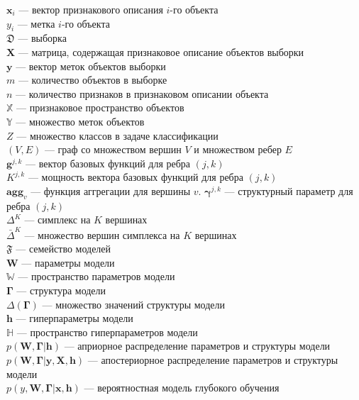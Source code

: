 \noindent$\mathbf{x}_i$ --- вектор признакового описания $i$-го объекта\\
$y_i$ --- метка $i$-го объекта\\
$\mathfrak{D}$ --- выборка\\
$\mathbf{X}$ --- матрица, содержащая признаковое описание объектов выборки\\
$\mathbf{y}$ --- вектор меток объектов выборки\\
$m$ --- количество объектов в выборке\\
$n$ --- количество признаков в признаковом описании объекта\\
$\mathbb{X}$ --- признаковое пространство объектов\\
$\mathbb{Y}$ --- множество меток объектов\\
$Z$ --- множество классов в задаче классификации\\
$(V,E)$ --- граф со множеством вершин $V$ и множеством ребер $E$\\
$\mathbf{g}^{j,k}$ --- вектор базовых функций для ребра $(j,k)$\\
$K^{j,k}$ --- мощность вектора базовых функций для ребра $(j,k)$\\
$\textbf{agg}_v$ --- функция аггрегации для вершины $v$. 
$\boldsymbol{\gamma}^{j,k}$ --- структурный параметр для ребра $(j,k)$\\
$\Delta^{K}$ --- симплекс на $K$ вершинах\\
$\bar{\Delta}^{K}$ --- множество вершин симплекса на $K$ вершинах\\
$\mathfrak{F}$ --- семейство моделей\\
$\mathbf{W}$ --- параметры модели\\
$\mathbb{W}$ --- пространство параметров модели\\
$\boldsymbol{\Gamma}$ --- структура модели\\
$\Delta(\boldsymbol{\Gamma})$ --- множество значений структуры модели\\
$\mathbf{h}$ --- гиперпараметры модели\\
$\mathbb{H}$ --- пространство гиперпараметров модели\\
$p(\mathbf{W}, \boldsymbol{\Gamma}|\mathbf{h})$ --- априорное распределение параметров и структуры модели\\
$p(\mathbf{W}, \boldsymbol{\Gamma}|\mathbf{y}, \mathbf{X}, \mathbf{h})$ --- апостериорное распределение параметров и структуры модели\\
$p({y}, \mathbf{W},  \boldsymbol{\Gamma}|\mathbf{x}, \mathbf{h})$ --- вероятностная модель глубокого обучения\\
